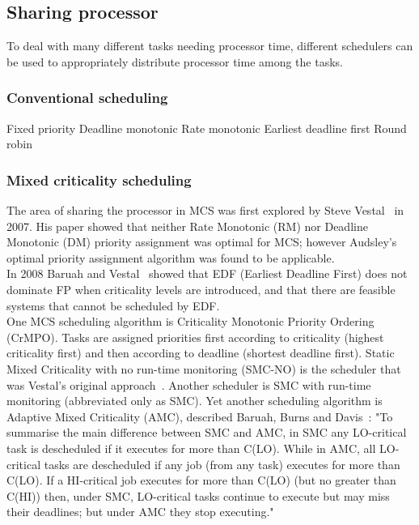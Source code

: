 \subsection{Sharing processor}
To deal with many different tasks needing processor time, different schedulers can be used to appropriately distribute processor time among the tasks.

\subsubsection{Conventional scheduling}
Fixed priority
Deadline monotonic
Rate monotonic
Earliest deadline first
Round robin

\subsubsection{Mixed criticality scheduling}
The area of sharing the processor in MCS was first explored by Steve Vestal~\cite{vestal2007} in 2007. His paper showed that neither Rate Monotonic (RM) nor Deadline Monotonic (DM) priority assignment was optimal for MCS; however Audsley’s optimal priority assignment algorithm \cite{audsley2001} was found to be applicable.\\ %

In 2008 Baruah and Vestal~\cite{baruah2008} showed that EDF (Earliest Deadline First) does not dominate FP when criticality levels are introduced, and that there are feasible systems that cannot be scheduled by EDF.\\

One MCS scheduling algorithm is Criticality Monotonic Priority Ordering (CrMPO). Tasks are assigned priorities first according to criticality (highest criticality first) and then according to deadline (shortest deadline first). Static Mixed Criticality with no run-time monitoring (SMC-NO) is the scheduler that was Vestal's original approach~\cite{vestal2007}. Another scheduler is SMC with run-time monitoring (abbreviated only as SMC). Yet another scheduling algorithm is Adaptive Mixed Criticality (AMC), described Baruah, Burns and Davis~\cite{baruah2011}: "To summarise the main difference between SMC and AMC, in SMC any LO-critical task is descheduled if it executes for more than C(LO). While in AMC, all LO-critical tasks are descheduled if any job (from any task) executes for more than C(LO). If a HI-critical job executes for more than C(LO) (but no greater than C(HI)) then, under SMC, LO-critical tasks continue to execute but may miss their deadlines; but under AMC they stop executing."\\

